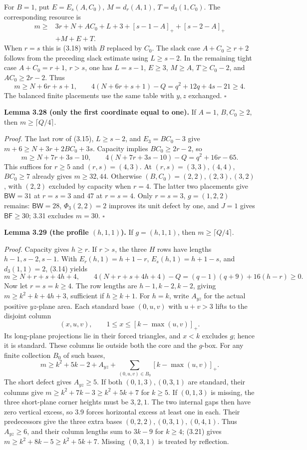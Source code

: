 \documentclass[11pt]{article}
\begin{document}
For $B=1$, put $E=E_s(A,C_0)$, $M=d_r(A,1)$, $T=d_3(1,C_0)$.
The corresponding resource is
\[
\begin{split}
 m\ge{}&3r+N+AC_0+L+3+[s-1-A]_++[s-2-A]_+\\
 &+M+E+T.
\end{split}\tag{3.20}
\]
When $r=s$ this is (3.18) with $B$ replaced by $C_0$.
The slack case $A+C_0\ge r+2$ follows from the preceding slack estimate
using $L\ge s-2$.  In the remaining tight case $A+C_0=r+1$, $r>s$,
one has $L=s-1$, $E\ge3$, $M\ge A$, $T\ge C_0-2$, and
$AC_0\ge2r-2$.  Thus
\[
 m\ge N+6r+s+1,\qquad
 4(N+6r+s+1)-Q=q^2+12q+4s-21\ge4.
\]
The balanced finite placements use the same table with $y,z$ exchanged.
\ensuremath{\square}

\label{res:A3.5}
\textbf{Lemma 3.28 (only the first coordinate equal to one).}
If $A=1$, $B,C_0\ge2$, then $m\ge\lceil Q/4\rceil$.

\emph{Proof.}
The last row of (3.15), $L\ge s-2$, and $E_3=BC_0-3$ give
$m+6\ge N+3r+2BC_0+3s$.  Capacity implies
$BC_0\ge2r-2$, so
\[
 m\ge N+7r+3s-10,\qquad
 4(N+7r+3s-10)-Q=q^2+16r-65.
\]
This suffices for $r\ge5$ and $(r,s)=(4,3)$.
At $(r,s)=(3,3),(4,4)$, $BC_0\ge7$ already gives $m\ge32,44$.
Otherwise $(B,C_0)=(2,2),(2,3),(3,2)$, with $(2,2)$ excluded by
capacity when $r=4$.  The latter two placements give
$\mathsf{BW}=31$ at $r=s=3$ and $47$ at $r=s=4$.
Only $r=s=3$, $g=(1,2,2)$ remains: $\mathsf{BW}=28$,
$\Phi_3(2,2)=2$ improves its unit defect by one, and $J=1$ gives
$\mathsf{BF}\ge30$; 3.31 excludes $m=30$. \ensuremath{\square}

\label{res:A3.6}
\textbf{Lemma 3.29 (the profile $(h,1,1)$).}
If $g=(h,1,1)$, then $m\ge\lceil Q/4\rceil$.

\emph{Proof.}
Capacity gives $h\ge r$.  If $r>s$, the three $H$ rows have lengths
$h-1,s-2,s-1$.  With $E_r(h,1)=h+1-r$, $E_s(h,1)=h+1-s$,
and $d_3(1,1)=2$, (3.14) yields
\[
 m\ge N+r+s+4h+4,\qquad
 4(N+r+s+4h+4)-Q=(q-1)(q+9)+16(h-r)\ge0.
\]
Now let $r=s=k\ge4$.  The row lengths are $h-1,k-2,k-2$, giving
$m\ge k^2+k+4h+3$, sufficient if $h\ge k+1$.
For $h=k$, write $A_{yz}$ for the actual positive $yz$-plane area.
Each standard base $(0,u,v)$ with $u+v>3$ lifts to the disjoint column
\[
 (x,u,v),\qquad 1\le x\le[k-\max(u,v)]_+.
\]
Its long-plane projections lie in their forced triangles, and $x<k$
excludes $g$; hence it is standard.  These columns lie outside both the
core and the $g$-box.  For any finite collection $B_0$ of such bases,
\[
 m\ge k^2+5k-2+A_{yz}
       +\sum_{(0,u,v)\in B_0}[k-\max(u,v)]_+.\tag{3.21}
\]
The short defect gives $A_{yz}\ge5$.  If both $(0,1,3),(0,3,1)$ are
standard, their columns give $m\ge k^2+7k-3\ge k^2+5k+7$ for $k\ge5$.
If $(0,1,3)$ is missing, the three short-plane corner heights must be
$3,2,1$.  The two internal gaps then have zero vertical excess, so 3.9
forces horizontal excess at least one in each.  Their predecessors
give the three extra bases $(0,2,2),(0,3,1),(0,4,1)$.
Thus $A_{yz}\ge6$, and their column lengths sum to $3k-9$ for $k\ge4$;
(3.21) gives $m\ge k^2+8k-5\ge k^2+5k+7$.
Missing $(0,3,1)$ is treated by reflection.
\end{document}
